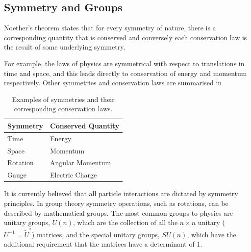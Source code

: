 \subsection{Symmetry and Groups}
Noether's theorem states that for every symmetry of nature, there is
a corresponding quantity that is conserved and conversely each conservation law
is the result of some underlying symmetry.

For example, the laws of physics are symmetrical with respect to translations in
time and space, and this leads directly to conservation of energy and momentum
respectively. Other symmetries and conservation laws are summarised in

\begin{table}
\begin{center}
\begin{tabular}{ l l }
Symmetry & Conserved Quantity \\ \hline
Time     & Energy \\
Space    & Momentum \\
Rotation & Angular Momentum \\
Gauge    & Electric Charge \\
\end{tabular}
\caption{Examples of symmetries and their corresponding conservation laws.
\label{tab:symmetry}}
\end{center}
\end{table}

It is currently believed that all particle interactions are dictated by symmetry
principles.  In group theory symmetry operations, such as rotations, can be
described by mathematical groups.
The most common groups to physics are unitary groups, $U(n)$, which are the
collection of all the $n\times n$ unitary ($U^{-1} = \tilde{U}^{*}$) matrices, and
the special unitary groups, $SU(n)$, which have the additional requirement that
the matrices have a determinant of 1.

